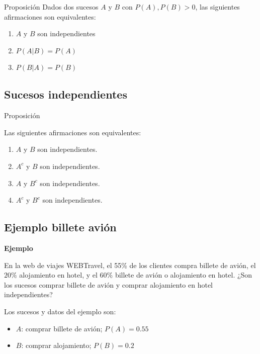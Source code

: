 \documentclass[]{book}
\providecommand{\tightlist}{%
  \setlength{\itemsep}{0pt}\setlength{\parskip}{0pt}}
\begin{document}
 Proposición
Dados dos sucesos \(A\) y \(B\) con \(P(A),P(B)>0\), las siguientes afirmaciones son equivalentes:

\begin{enumerate}
\def\labelenumi{\arabic{enumi}.}
\tightlist
\item
  \(A\) y \(B\) son independientes
\item
  \(P(A|B)=P(A)\)
\item
  \(P(B|A)=P(B)\)
\end{enumerate}

\hypertarget{sucesos-independientes-1}{%
\subsection{Sucesos independientes}\label{sucesos-independientes-1}}

 Proposición

Las siguientes afirmaciones son equivalentes:

\begin{enumerate}
\def\labelenumi{\arabic{enumi}.}
\tightlist
\item
  \(A\) y \(B\) son independientes.
\item
  \(A^c\) y \(B\) son independientes.
\item
  \(A\) y \(B^c\) son independientes.
\item
  \(A^c\) y \(B^c\) son independientes.
\end{enumerate}

\hypertarget{ejemplo-billete-aviuxf3n}{%
\subsection{Ejemplo billete avión}\label{ejemplo-billete-aviuxf3n}}

\textbf{Ejemplo}

En la web de viajes WEBTravel, el 55\% de los clientes compra billete de avión, el \(20\%\) alojamiento en hotel, y el \(60\%\) billete de avión o alojamiento en hotel. ¿Son los sucesos comprar billete de avión y comprar alojamiento en hotel independientes?

Los sucesos y datos del ejemplo son:

\begin{itemize}
\tightlist
\item
  \(A\): comprar billete de avión; \(P(A)=0.55\)
\item
  \(B\): comprar alojamiento; \(P(B)=0.2\)
\end{itemize}
\end{document}
